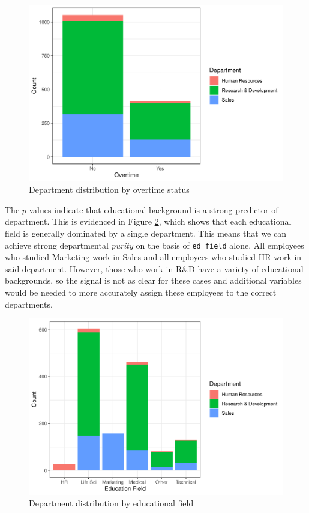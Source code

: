 \documentclass[
]{book}
\begin{document}
\begin{figure}

{\centering \includegraphics[width=1\linewidth]{The_Fundamentals_of_People_Analytics_files/figure-latex/ot-dept-1} 

}

\caption{Department distribution by overtime status}\label{fig:ot-dept}
\end{figure}

The \(p\)-values indicate that educational background is a strong predictor of department. This is evidenced in Figure \ref{fig:ed-field-dept}, which shows that each educational field is generally dominated by a single department. This means that we can achieve strong departmental \emph{purity} on the basis of \texttt{ed\_field} alone. All employees who studied Marketing work in Sales and all employees who studied HR work in said department. However, those who work in R\&D have a variety of educational backgrounds, so the signal is not as clear for these cases and additional variables would be needed to more accurately assign these employees to the correct departments.

\begin{figure}

{\centering \includegraphics[width=1\linewidth]{The_Fundamentals_of_People_Analytics_files/figure-latex/ed-field-dept-1} 

}

\caption{Department distribution by educational field}\label{fig:ed-field-dept}
\end{figure}
\end{document}
